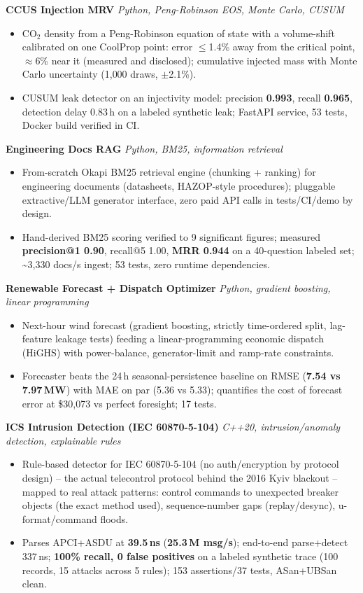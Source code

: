 \documentclass[10pt]{article}
\newcommand{\projectentry}[2]{%
  \noindent\textbf{#1} \hfill \textit{#2}\\[-0.3em]
}
\begin{document}
\projectentry{CCUS Injection MRV}{Python, Peng-Robinson EOS, Monte Carlo, CUSUM}
\begin{itemize}
  \item CO$_2$ density from a Peng-Robinson equation of state with a volume-shift calibrated on one CoolProp point: error $\leq$1.4\% away from the critical point, $\approx$6\% near it (measured and disclosed); cumulative injected mass with Monte Carlo uncertainty (1{,}000 draws, $\pm$2.1\%).
  \item CUSUM leak detector on an injectivity model: precision \textbf{0.993}, recall \textbf{0.965}, detection delay 0.83\,h on a labeled synthetic leak; FastAPI service, 53 tests, Docker build verified in CI.
\end{itemize}

\projectentry{Engineering Docs RAG}{Python, BM25, information retrieval}
\begin{itemize}
  \item From-scratch Okapi BM25 retrieval engine (chunking + ranking) for engineering documents (datasheets, HAZOP-style procedures); pluggable extractive/LLM generator interface, zero paid API calls in tests/CI/demo by design.
  \item Hand-derived BM25 scoring verified to 9 significant figures; measured \textbf{precision@1 0.90}, recall@5 1.00, \textbf{MRR 0.944} on a 40-question labeled set; \textasciitilde3{,}330 docs/s ingest; 53 tests, zero runtime dependencies.
\end{itemize}

\projectentry{Renewable Forecast + Dispatch Optimizer}{Python, gradient boosting, linear programming}
\begin{itemize}
  \item Next-hour wind forecast (gradient boosting, strictly time-ordered split, lag-feature leakage tests) feeding a linear-programming economic dispatch (HiGHS) with power-balance, generator-limit and ramp-rate constraints.
  \item Forecaster beats the 24\,h seasonal-persistence baseline on RMSE (\textbf{7.54 vs 7.97\,MW}) with MAE on par (5.36 vs 5.33); quantifies the cost of forecast error at \$30{,}073 vs perfect foresight; 17 tests.
\end{itemize}

\projectentry{ICS Intrusion Detection (IEC 60870-5-104)}{C++20, intrusion/anomaly detection, explainable rules}
\begin{itemize}
  \item Rule-based detector for IEC 60870-5-104 (no auth/encryption by protocol design) -- the actual telecontrol protocol behind the 2016 Kyiv blackout -- mapped to real attack patterns: control commands to unexpected breaker objects (the exact method used), sequence-number gaps (replay/desync), u-format/command floods.
  \item Parses APCI+ASDU at \textbf{39.5\,ns} (\textbf{25.3\,M msg/s}); end-to-end parse+detect 337\,ns; \textbf{100\% recall, 0 false positives} on a labeled synthetic trace (100 records, 15 attacks across 5 rules); 153 assertions/37 tests, ASan+UBSan clean.
\end{itemize}
\end{document}
